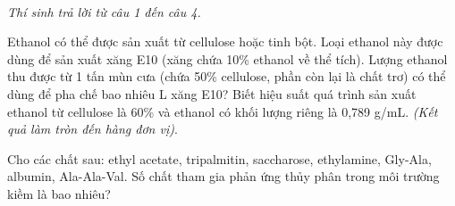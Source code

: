 \documentclass[11pt,a4paper]{article}
\begin{document}
\vspace{6pt}
 \\
\textit{Thí sinh trả lời từ câu 1 đến câu 4.}
\vspace{4pt}

\begin{ex}
Ethanol có thể được sản xuất từ cellulose hoặc tinh bột. Loại ethanol này được dùng để sản xuất xăng E10 (xăng chứa 10\% ethanol về thể tích). Lượng ethanol thu được từ 1 tấn mùn cưa (chứa 50\% cellulose, phần còn lại là chất trơ) có thể dùng để pha chế bao nhiêu L xăng E10? Biết hiệu suất quá trình sản xuất ethanol từ cellulose là 60\% và ethanol có khối lượng riêng là 0,789 g/mL. \textit{(Kết quả làm tròn đến hàng đơn vị)}.
\end{ex}

\begin{ex}
Cho các chất sau: ethyl acetate, tripalmitin, saccharose, ethylamine, Gly-Ala, albumin, Ala-Ala-Val. Số chất tham gia phản ứng thủy phân trong môi trường kiềm là bao nhiêu?
\end{ex}
\end{document}
